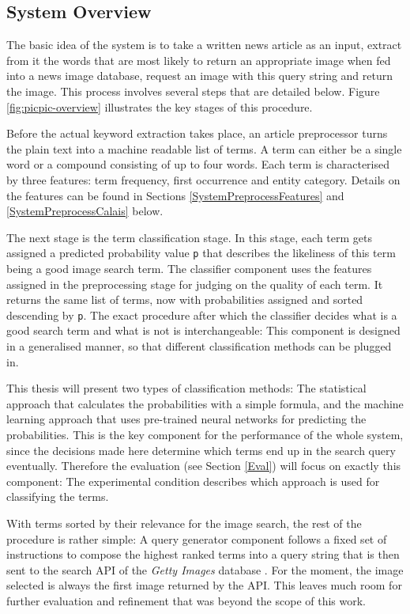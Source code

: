 \documentclass[11pt,a4paper,twoside]{article}
\begin{document}
\subsection{System Overview} \label{SystemOverview}

The basic idea of the system is to take a written news article as an input, extract from it the words that are most likely to return an appropriate image when fed into a news image database, request an image with this query string and return the image. This process involves several steps that are detailed below. Figure \ref{fig:picpic-overview} illustrates the key stages of this procedure.

Before the actual keyword extraction takes place, an article preprocessor turns the plain text into a machine readable list of terms. A term can either be a single word or a compound consisting of up to four words. Each term is characterised by three features: term frequency, first occurrence and entity category. Details on the features can be found in Sections \ref{SystemPreprocessFeatures} and \ref{SystemPreprocessCalais} below.

The next stage is the term classification stage. In this stage, each term gets assigned a predicted probability value \lstinline|p| that describes the likeliness of this term being a good image search term. The classifier component uses the features assigned in the preprocessing stage for judging on the quality of each term. It returns the same list of terms, now with probabilities assigned and sorted descending by \lstinline{p}. The exact procedure after which the classifier decides what is a good search term and what is not is interchangeable: This component is designed in a generalised manner, so that different classification methods can be plugged in.

This thesis will present two types of classification methods: The statistical approach that calculates the probabilities with a simple formula, and the machine learning approach that uses pre-trained neural networks for predicting the probabilities. This is the key component for the performance of the whole system, since the decisions made here determine which terms end up in the search query eventually. Therefore the evaluation (see Section \ref{Eval}) will focus on exactly this component: The experimental condition describes which approach is used for classifying the terms.

With terms sorted by their relevance for the image search, the rest of the procedure is rather simple: A query generator component follows a fixed set of instructions to compose the highest ranked terms into a query string that is then sent to the search API of the \emph{Getty Images} database \cite{GettyImagesAPIOverview}. For the moment, the image selected is always the first image returned by the API. This leaves much room for further evaluation and refinement that was beyond the scope of this work.
\end{document}

